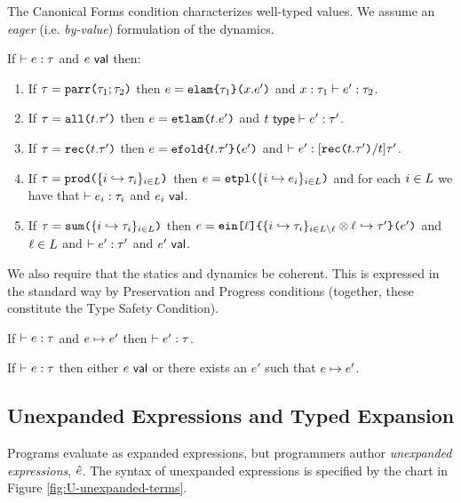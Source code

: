 The Canonical Forms condition characterizes well-typed values. We assume an \emph{eager} (i.e. \emph{by-value}) formulation of the dynamics. 
\begin{condition}\label{condition:canonical-forms-U} If $\vdash e : \tau$ and $e~\mathsf{val}$ then:
\begin{enumerate}
\item If $\tau=\texttt{parr}\texttt{(}\tau_1; \tau_2\texttt{)}$ then $e=\texttt{elam}\texttt{\{}\tau_1\texttt{\}(}x.e'\texttt{)}$ and $x : \tau_1 \vdash e' : \tau_2$.
\item If $\tau=\texttt{all}\texttt{(}t.\tau'\texttt{)}$ then $e=\texttt{etlam}\texttt{(}t.e'\texttt{)}$ and $t~\mathsf{type} \vdash e' : \tau'$.
\item If $\tau=\texttt{rec}\texttt{(}t.\tau'\texttt{)}$ then $e=\texttt{efold}\texttt{\{}t.\tau'\texttt{\}(}e'\texttt{)}$ and $\vdash e' : [\texttt{rec}\texttt{(}t.\tau'\texttt{)}/t]\tau'$. 
\item If $\tau=\texttt{prod}\texttt{(}\{i \hookrightarrow \tau_{i}\}_{i \in L}\texttt{)}$ then $e=\texttt{etpl}\texttt{(}\{i \hookrightarrow e_{i}\}_{i \in L}\texttt{)}$ and for each $i \in L$ we have that $\vdash e_i : \tau_i$ and $e_i~\mathsf{val}$.
\item If $\tau=\texttt{sum}\texttt{(}\{i \hookrightarrow \tau_{i}\}_{i \in L}\texttt{)}$ then $e=\texttt{ein}\texttt{[}\ell\texttt{]\{}\{i \hookrightarrow \tau_{i}\}_{i \in L\setminus \ell} \otimes \ell \hookrightarrow \tau'\texttt{\}(}e'\texttt{)}$ and $\ell \in L$ and $\vdash e' : \tau'$ and $e'~\mathsf{val}$.
\end{enumerate}\end{condition}

We also require that the statics and dynamics be coherent. This is expressed in the standard way by Preservation and Progress conditions (together, these constitute the {Type Safety} Condition). 
\begin{condition}[Preservation]\label{condition:preservation-U} If $\vdash e : \tau$ and $e \mapsto e'$ then $\vdash e' : \tau$. \end{condition}
\begin{condition}[Progress]\label{condition:progress-U} If $\vdash e : \tau$ then either $e~\mathsf{val}$ or there exists an $e'$ such that $e \mapsto e'$. \end{condition}


\subsection{Unexpanded Expressions and Typed Expansion}
Programs evaluate as expanded expressions, but programmers author \emph{unexpanded expressions}, $\hat{e}$. The syntax of unexpanded expressions is specified by the chart in Figure \ref{fig:U-unexpanded-terms}. 

